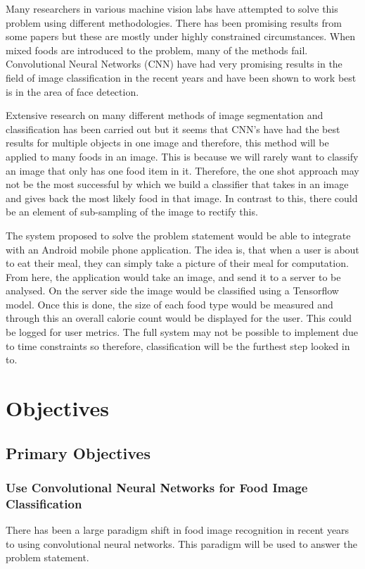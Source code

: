 Many researchers in various machine vision labs have attempted to solve this
problem using different methodologies.
There has been promising results from some papers but these are mostly under highly constrained circumstances.
When mixed foods are introduced to the problem, many of the methods fail.
Convolutional Neural Networks (CNN) have had very promising results in the field of image classification in the recent years and have been shown to work best is in the area of face detection.

Extensive research on many different methods of image segmentation and classification has been carried out but it seems that CNN's have had the best results for multiple objects in one image and therefore, this method will be applied to many foods in an image.
This is because we will rarely want to classify an image that only has one food
item in it. Therefore, the one shot approach may not be the most successful by which we
build a classifier that takes in an image and gives back the most likely food in
that image. In contrast to this, there could be an element of sub-sampling of the image to rectify this.

The system proposed to solve the problem statement would be able to integrate with an Android mobile phone application. The idea is, that when a user is about to eat their meal, they can simply take a picture of their meal for computation. From here, the application would take an image, and send it to a server to be analysed.
On the server side the image would be classified using a Tensorflow model.
Once this is done, the size of each food type would be measured and through this an overall calorie count would be displayed for the user. This could be logged for user metrics. The full system may not be possible to implement due to time constraints so therefore, classification will be the furthest step looked in to.

\section{Objectives}
\subsection*{Primary Objectives}
\subsubsection*{Use Convolutional Neural Networks for Food Image Classification}
There has been a large paradigm shift in food image recognition in recent years to using convolutional neural networks. This paradigm will be used to answer the problem statement.

